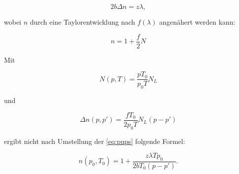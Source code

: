\begin{equation}
    2b\Delta n = z\lambda,
\end{equation}

wobei \(n\) durch eine Taylorentwicklung nach \(f(\lambda)\) angenähert werden kann:

\begin{equation}
    n = 1+\frac{f}{2} N
    \label{eq:pups}
\end{equation}

Mit 

\begin{equation}
    N(p,T) = \frac{pT_0}{p_0T} N_L
\end{equation}

und 

\begin{equation}
    \Delta n(p,p') = \frac{fT_0}{2p_0T} N_L (p-p')
\end{equation}

ergibt nicht nach Umstellung der \autoref{eq:pups} folgende Formel:

\begin{equation}
    n(p_0,T_0) = 1 + \frac{z\lambda T p_0}{2bT_0 (p-p')}.
    \label{eq:Druck}
\end{equation}